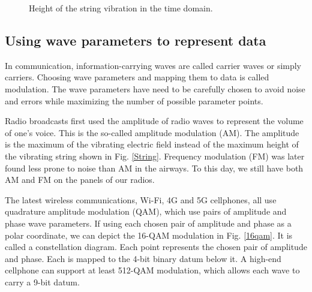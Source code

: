 \documentclass[oneside, letter, 12pt]{book}
\begin{document}
\begin{figure}[h]\label{Wave}
\caption{Height of the string vibration in the time domain.}
\end{figure}

\subsection{Using wave parameters to represent data}
In communication, information-carrying waves are called carrier waves or simply carriers. Choosing wave parameters and mapping them to data is called modulation. The wave parameters have need to be carefully chosen to avoid noise and errors while maximizing the number of possible parameter points.

Radio broadcasts first used the amplitude of radio waves to represent the volume of one's voice. This is the so-called amplitude modulation (AM). The amplitude is the maximum of the vibrating electric field instead of the maximum height of the vibrating string shown in Fig. \ref{String}. Frequency modulation (FM) was later found less prone to noise than AM in the airways. To this day, we still have both AM and FM on the panels of our radios.

The latest wireless communications, Wi-Fi, 4G and 5G cellphones, all use quadrature amplitude modulation (QAM), which use pairs of amplitude and phase wave parameters. If using each chosen pair of amplitude and phase as a polar coordinate, we can depict the 16-QAM modulation in Fig. \ref{16qam}. It is called a constellation diagram. Each point represents the chosen pair of amplitude and phase. Each is mapped to the 4-bit binary datum below it. A high-end cellphone can support at least 512-QAM modulation, which allows each wave to carry a 9-bit datum.
\end{document}
